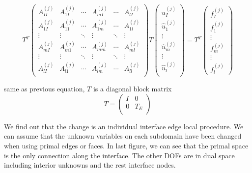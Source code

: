 \begin{equation}
T^{T} \begin{pmatrix}
A_{II}^{(j)} & A_{1I}^{(j)} & \cdots & A_{mI}^{(j)} & \cdots & A_{l I}^{(j)} \\
A_{1 I}^{(j)} & A_{11}^{(j)} & \cdots & A_{1m}^{(j)} & \cdots & A_{1l}^{(j)} \\
\vdots & \vdots & \ddots & \vdots & \ddots & \vdots \\
A_{mI}^{(j)} & A_{m1}^{(j)} & \cdots & A_{mm}^{(j)} & \cdots & A_{ml}^{(j)} \\
\vdots & \vdots & \ddots & \vdots & \ddots & \vdots \\
A_{lI}^{(j)} & A_{l1}^{(j)} & \cdots & A_{lm}^{(j)} & \cdots & A_{ll}^{(j)}\\
\end{pmatrix} T \begin{pmatrix}
u_{I}^{(j)} \\ \hat{u}_{1}^{(j)} \\ \vdots \\ \hat{u}_{m}^{(j)} \\ \vdots \\ \hat{u}_{l}^{(j)}\\
\end{pmatrix} = T^{T} \begin{pmatrix}
f_{I}^{(j)} \\ f_{1}^{(j)} \\ \vdots \\ f_{m}^{(j)} \\ \vdots \\ f_{l}^{(j)}
\end{pmatrix}
\end{equation}

same as previous equation, $ T $ is a diagonal block matrix 
\begin{equation}
T = \begin{pmatrix}
I & 0 \\ 
0 & T_{E}\\
\end{pmatrix}
\end{equation}

We find out that the change is an individual interface edge local procedure. We can assume that the unknown variables on each subdomain have been changed when using primal edges or faces. In last figure, we can see that the primal space is the only connection along the interface. The other DOFs are in dual space including interior unknowns and the rest interface nodes.

